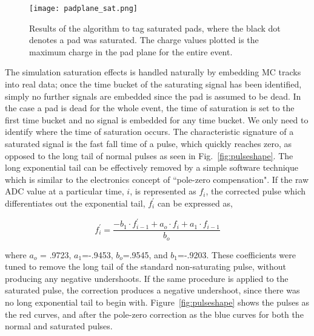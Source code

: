 \begin{figure}[!htb]
\texttt{[image: padplane\_sat.png]}
\caption{Results of the algorithm to tag saturated pads, where the black dot denotes a pad was saturated. The charge values plotted is the maximum charge in the pad plane for the entire event.}
\label{fig:satTag}
\end{figure}

The simulation saturation effects is handled naturally by embedding MC tracks into real data; once the time bucket of the saturating signal has been identified, simply no further signals are embedded since the pad is assumed to be dead. In the case a pad is dead for the whole event, the time of saturation is set to the first time bucket and no signal is embedded for any time bucket. We only need to identify where the time of saturation occurs. The characteristic signature of a saturated signal is the fast fall time of a pulse, which quickly reaches zero, as opposed to the long tail of normal pulses as seen in Fig.~\ref{fig:pulseshape}. The long exponential tail can be effectively removed by a simple software technique which is similar to the electronics concept of ``pole-zero compensation". If the raw ADC value at a particular time, $i$, is represented as $f_i$, the corrected pulse which differentiates out the exponential tail, $f_i^{'}$ can be expressed as, 

\begin{equation}
f_i^{'} = \frac{-b_1\cdot f_{i-1}^{'} + a_o\cdot f_i + a_1 \cdot f_{i-1}}{b_o}
\label{eq:satpolez}
\end{equation}

where $a_o$ = .9723, $a_1$=-.9453, $b_o$=.9545, and $b_1$=-.9203. These coefficients were tuned to remove the long tail of the standard non-saturating pulse, without producing any negative undershoots. If the same procedure is applied to the saturated pulse, the correction produces a negative undershoot, since there was no long exponential tail to begin with. Figure~\ref{fig:pulseshape} shows the pulses as the red curves, and after the pole-zero correction as the blue curves for both the normal and saturated pulses. 

